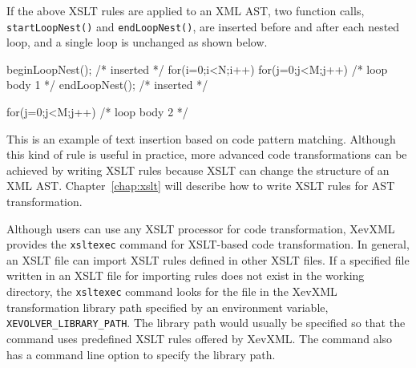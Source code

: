 If the above XSLT rules are applied to an XML AST, two function calls,
\texttt{startLoopNest()} and \texttt{endLoopNest()}, are inserted before
and after each nested loop, and a single loop is unchanged as shown
below.
\begin{framed}
\begin{src}
beginLoopNest(); /* inserted */
for(i=0;i<N;i++){
  for(j=0;j<M;j++){
    /* loop body 1 */
  }
}
endLoopNest();  /* inserted */

for(j=0;j<M;j++){
 /* loop body 2 */
}
\end{src}
\end{framed}
This is an example of text insertion based on code pattern matching.
Although this kind of rule is useful in practice, more advanced code
transformations can be achieved by writing XSLT rules because XSLT can
change the structure of an XML AST.  Chapter~\ref{chap:xslt} will
describe how to write XSLT rules for AST transformation.

Although users can use any XSLT processor for code transformation,
XevXML provides the \texttt{xsltexec} command for XSLT-based code
transformation. In general, an XSLT file can import XSLT rules defined
in other XSLT files. If a specified file written in an XSLT file for
importing rules does not exist in the working directory, the
\texttt{xsltexec} command looks for the file in the XevXML
transformation library path specified by an environment variable,
\texttt{XEVOLVER\_LIBRARY\_PATH}. The library path would usually be
specified so that the command uses predefined XSLT rules offered by
XevXML.  The command also has a command line option to specify the
library path.


